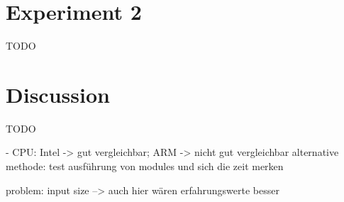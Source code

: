 \section{Experiment 2}

TODO

\section{Discussion}

TODO

- CPU: Intel -> gut vergleichbar; ARM -> nicht gut vergleichbar
alternative methode: test ausführung von modules und sich die zeit merken

problem: input size --> auch hier wären erfahrungswerte besser